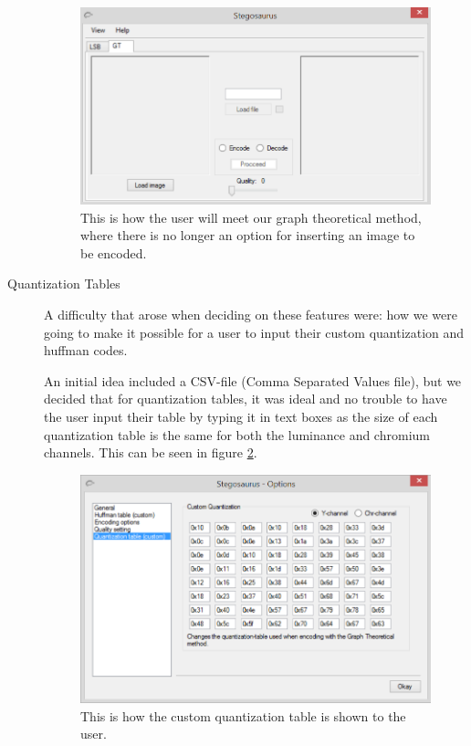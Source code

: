 \begin{description}
\begin{figure}
	\centering
	\includegraphics[width=1\textwidth]{figures/StegoGTAMain.png}
	\caption{This is how the user will meet our graph theoretical method, where there is no longer an option for inserting an image to be encoded.}
	\label{fig:StegoGTAMain2}
\end{figure}

\item[Quantization Tables]
A difficulty that arose when deciding on these features were: how we were going to make it possible for a user to input their custom quantization and huffman codes.

An initial idea included a CSV-file (Comma Separated Values file), but we decided that for quantization tables, it was ideal and no trouble to have the user input their table by typing it in text boxes as the size of each quantization table is the same for both the luminance and chromium channels. This can be seen in figure \ref{fig:StegoOptionQuant}.


\begin{figure}
	\centering
	\includegraphics[width=1\textwidth]{figures/StegoOptionQuant.png}
	\caption{This is how the custom quantization table is shown to the user.}
	\label{fig:StegoOptionQuant}
\end{figure}


\end{description}
